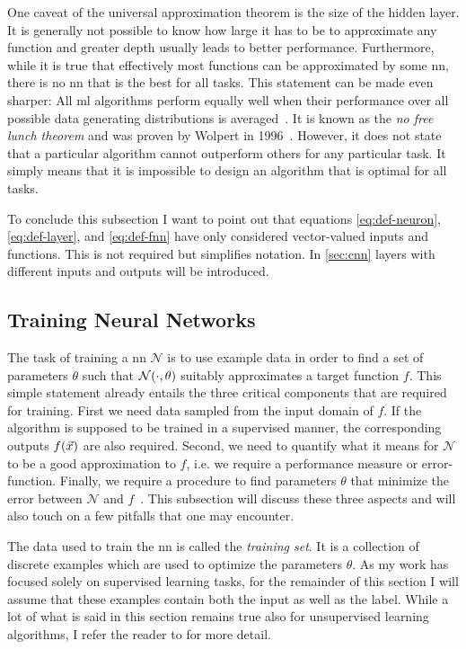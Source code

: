 One caveat of the universal approximation theorem is the size of the hidden layer. It is generally not possible to know how large it has to be to approximate any function and greater depth usually leads to better performance. Furthermore, while it is true that effectively most functions can be approximated by some \acrshort{nn}, there is no \acrshort{nn} that is the best for all tasks. This statement can be made even sharper: All \acrshort{ml} algorithms perform equally well when their performance over all possible data generating distributions is averaged~\cite{Goodfellow:2016:DNN}. %
It is known as the \emph{no free lunch theorem} and was proven by Wolpert in 1996~\cite{Wolpert:1996aaa}. However, it does not state that a particular algorithm cannot outperform others for any particular task. It simply means that it is impossible to design an algorithm that is optimal for all tasks.

To conclude this subsection I want to point out that equations \eqref{eq:def-neuron}, \eqref{eq:def-layer}, and \eqref{eq:def-fnn} have only considered vector-valued inputs and functions. This is not required but simplifies notation. In \autoref{sec:cnn} layers with different inputs and outputs will be introduced.


\subsection{Training Neural Networks}\label{sec:nn-training}
The task of training a \acrshort{nn} $\mathcal{N}$ is to use example data in order to find a set of parameters $\theta$ such that $\mathcal{N}{\left( \cdot,\theta \right)}$ suitably approximates a target function $f$. This simple statement already entails the three critical components that are required for training. First we need data sampled from the input domain of $f$. If the algorithm is supposed to be trained in a supervised manner, the corresponding outputs $f{\left( \vec{x} \right)}$ are also required. Second, we need to quantify what it means for $\mathcal{N}$ to be a good approximation to $f$, i.e. we require a performance measure or error-function. Finally, we require a procedure to find parameters $\theta$ that minimize the error between $\mathcal{N}$ and $f$~\cite{Goodfellow:2016:DNN}. %
This subsection will discuss these three aspects and will also touch on a few pitfalls that one may encounter.

The data used to train the \acrshort{nn} is called the \emph{training set}. It is a collection of discrete examples which are used to optimize the parameters $\theta$. As my work has focused solely on supervised learning tasks, for the remainder of this section I will assume that these examples contain both the input as well as the label. While a lot of what is said in this section remains true also for unsupervised learning algorithms, I refer the reader to \cite{Goodfellow:2016:DNN} for more detail.

